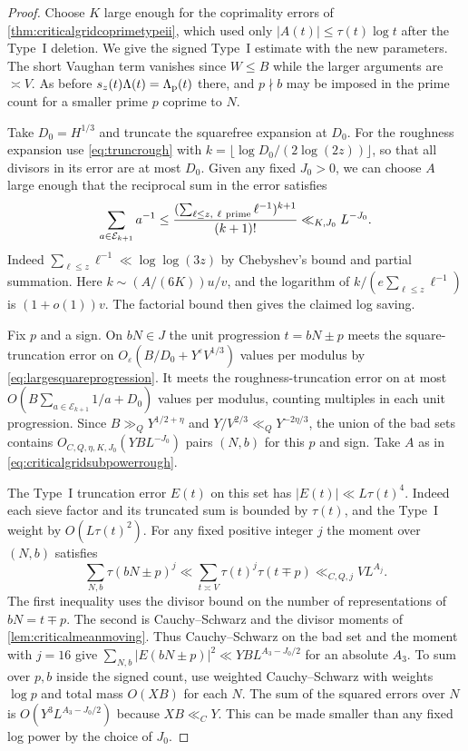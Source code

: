 \documentclass[11pt,a4paper]{article}
\numberwithin{equation}{section}
\begin{document}
\begin{proof}
Choose $K$ large enough for the coprimality errors
of \cref{thm:criticalgridcoprimetypeii}, which used
only $|A(t)|\le\tau(t)\log t$ after the Type~I
deletion. We give the signed Type~I estimate with the
new parameters. The short Vaughan term vanishes since
$W\le B$ while the larger arguments are $\asymp V$.
As before $s_z(t)\Lambda(t)=\Lambda_{\rm p}(t)$
there, and $p\nmid b$ may be imposed in the prime
count for a smaller prime $p$ coprime to $N$.

Take $D_0=H^{1/3}$ and truncate the squarefree
expansion at $D_0$. For the roughness expansion use
\cref{eq:truncrough} with
$k=\lfloor\log D_0/(2\log(2z))\rfloor$, so that all
divisors in its error are at most $D_0$.
Given any fixed $J_0>0$, we can choose $A$ large enough
that the reciprocal sum in the error satisfies
\begin{equation}
 \sum_{a\in\mathcal E_{k+1}}a^{-1}
    \le \frac{(\sum_{\ell\le z,\ \ell\ {\rm prime}}\ell^{-1})^{k+1}}
             {(k+1)!}
       \ll_{K,J_0} L^{-J_0}.
 \label{eq:criticalgridsubpowerrough}
\end{equation}
Indeed $\sum_{\ell\le z}\ell^{-1}\ll\log\log(3z)$
by Chebyshev's bound and partial summation. Here
$k\sim (A/(6K))u/v$, and the logarithm of
$k/(e\sum_{\ell\le z}\ell^{-1})$ is $(1+o(1))v$.
The factorial bound then gives the claimed log saving.

Fix $p$ and a sign. On $bN\in J$ the unit
progression $t=bN\pm p$ meets the square-truncation
error on $O_\varepsilon(B/D_0+Y^\varepsilon V^{1/3})$
values per modulus by \cref{eq:largesquareprogression}.
It meets the roughness-truncation error on at most
$O(B\sum_{a\in\mathcal E_{k+1}}1/a+D_0)$ values
per modulus, counting multiples in each unit
progression. Since $B\gg_Q Y^{1/2+\eta}$ and
$Y/V^{2/3}\ll_Q Y^{-2\eta/3}$, the union of the bad
sets contains $O_{C,Q,\eta,K,J_0}(YB L^{-J_0})$
pairs $(N,b)$ for this $p$ and sign. Take $A$ as
in \cref{eq:criticalgridsubpowerrough}.

The Type~I truncation error $E(t)$ on this set
has $|E(t)|\ll L\tau(t)^4$. Indeed each sieve
factor and its truncated sum is bounded by
$\tau(t)$, and the Type~I weight by
$O(L\tau(t)^2)$. For any fixed positive integer
$j$ the moment over $(N,b)$ satisfies
\[
 \sum_{N,b}\tau(bN\pm p)^j
 \ll \sum_{t\asymp V}\tau(t)^j\tau(t\mp p)
 \ll_{C,Q,j} V L^{A_j}.
\]
The first inequality uses the divisor bound on
the number of representations of $bN=t\mp p$.
The second is Cauchy--Schwarz and the divisor
moments of \cref{lem:criticalmeanmoving}.
Thus Cauchy--Schwarz on the bad set and the moment
with $j=16$ give
$\sum_{N,b}|E(bN\pm p)|^2\ll YB L^{A_3-J_0/2}$
for an absolute $A_3$. To sum over $p,b$ inside the
signed count, use weighted Cauchy--Schwarz with
weights $\log p$ and total mass $O(XB)$ for each
$N$. The sum of the squared errors over $N$ is
$O(Y^3 L^{A_3-J_0/2})$ because $XB\ll_C Y$.
This can be made smaller than any fixed log power
by the choice of $J_0$.


\end{proof}
\end{document}

